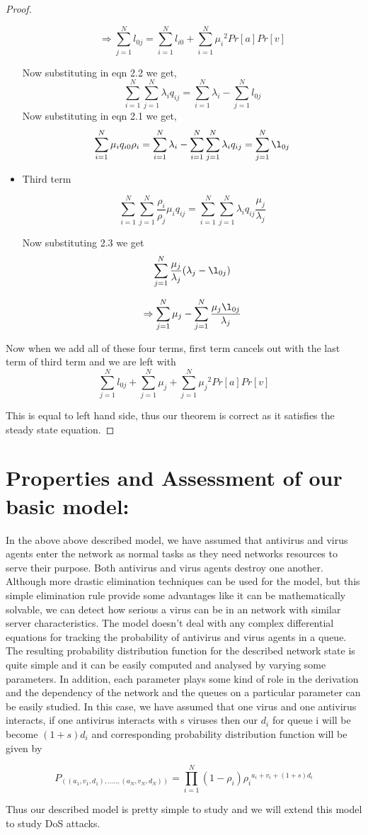 \begin{proof}
\begin{itemize}
$$\Rightarrow\sum_{j=1}^{N}l_{0j}=\sum_{i=1}^{N}l_{i0}
+\sum_{i=1}^{N}{\mu_{i}}^{2}Pr[a]Pr[v]$$

Now substituting in eqn 2.2 we get,
\begin{equation}
\sum_{i=1}^{N}\sum_{j=1}^{N}\lambda_iq_{ij}=\sum_{i=1}^{N}\lambda_i
-\sum_{j=1}^{N}l_{0j}
\end{equation}
Now substituting in eqn 2.1 we get, 
\begin{equation}
\sum_{i=1}^{N}\mu_iq_{i0}\rho_i=\sum_{i=1}^{N}\lambda_i-
\sum_{i=1}^{N}\sum_{j=1}^{N}\lambda_iq_{ij}=
\sum_{j=1}^{N}\l_{0j}
\end{equation}
\item Third term
 
$$\sum_{i=1}^{N}\sum_{j=1}^{N}\frac{\rho_i}{\rho_j}\mu_iq_{ij}=\sum_{i=1}^{N}\sum_{j=1}^{N}\lambda_iq_{ij}
\frac{\mu_j}{\lambda_j}$$

Now substituting 2.3 we get 
$$\sum_{j=1}^{N}\frac{\mu_j}{\lambda_j}(\lambda_j-\l_{0j})$$

$$\Rightarrow\sum_{j=1}^{N}\mu_j- \sum_{j=1}^{N}\frac{\mu_j\l_{0j}}{\lambda_j}$$

\end{itemize}

Now when we add all of these four terms, first term cancels out with the last term of third term and we are left with 
$$\sum_{j=1}^{N}l_{0j}+\sum_{j=1}^{N}\mu_j+\sum_{j=1}^{N}{\mu_{j}}^{2}Pr[a]Pr[v]$$

This is equal to left hand side, thus our theorem is correct as it satisfies the steady state equation.

\end{proof}

\section{Properties and Assessment of our basic model:}

In the above above described model, we have assumed that antivirus and virus agents enter the network as normal tasks as they need networks resources to serve their purpose. Both antivirus and virus agents destroy one another. Although more drastic elimination
techniques can be used for the model, but this simple elimination rule provide some advantages like it can be mathematically solvable, we can detect how serious a virus can be in an network with similar server characteristics. The model doesn't deal with any complex differential equations for tracking the probability of antivirus and virus agents in a queue. The resulting probability
distribution function for the described network state is quite simple and it can be easily computed and analysed by varying some parameters. In addition, each parameter plays some kind of role in the derivation and the dependency of the network and the queues on a particular parameter can be easily studied. In this case, we have assumed that one virus and one antivirus interacts, if one antivirus interacts with s viruses then our $d_i$ for queue i will be become $(1+s)d_i$ and corresponding probability distribution function will be given by

$$P_{((a_1,v_1,d_1),.....,(a_N,v_N,d_N))} =      \prod_{i=1}^{N} (1-\rho_i){{\rho_i}^{a_i+v_i+(1+s)d_i}}$$

Thus our described model is pretty simple to study and we will extend this model to study DoS attacks.

